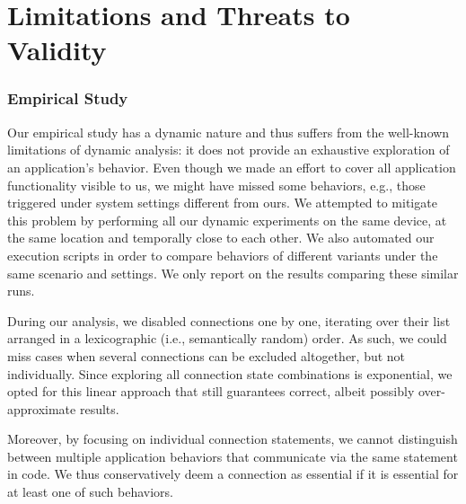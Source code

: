 \vspace{0.05in}
\vspace{-0.1in}
\section{Limitations and Threats to \\Validity}
\label{sec:limitations}

\subsubsection{Empirical Study}
Our empirical study has a dynamic nature and thus suffers from the well-known limitations of dynamic analysis: it does not provide an exhaustive exploration of an application's behavior.
Even though we made an effort to cover all application functionality visible to us, we might have missed some behaviors, e.g., those triggered under system settings different from ours. 
We attempted to mitigate this problem by performing all our dynamic experiments on the same device, at the same location and temporally close to each other.  
We also automated our execution scripts in order to compare behaviors of different variants under the same scenario and settings. 
We only report on the results comparing these similar runs.  

During our analysis, we disabled connections one by one, iterating over their list arranged in a lexicographic (i.e., semantically random) order. As such, we could miss cases when 
several connections can be excluded altogether, but not individually. 
Since exploring all connection state combinations is exponential, we opted for this linear approach that still guarantees correct, 
albeit possibly over-approximate results. 

Moreover, by focusing on individual connection statements, we cannot distinguish between multiple application behaviors
that communicate via the same statement in code. We thus conservatively deem a connection as essential if it is essential for at least one of such behaviors. 
 
